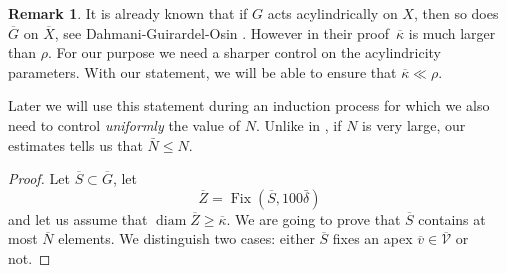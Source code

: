 \documentclass[11pt]{article}
\let\mathcal\mathscr
\theoremstyle{plain}
\theoremstyle{definition}
\newtheorem{rem}[thm]{Remark}
\DeclareMathOperator{\diam}{diam}
\DeclareMathOperator{\Fix}{Fix}
\newcommand{\q}[1]{\overline{#1}}
\begin{document}
\begin{rem}
It is already known that if $G$ acts acylindrically on $X$, then so does~$\q G$ on $\q X$, see Dahmani-Guirardel-Osin \cite[Prop.\,2.17, 5.33]{dahmani_hyperbolically_2017}.
However in their proof~$\q\kappa$ is much larger than $\rho$.
For our purpose we need a sharper control on the acylindricity parameters.
With our statement, we will be able to ensure that $\q\kappa \ll \rho$.

Later we will use this statement during an induction process for which we also need to control \emph{uniformly} the value of $N$.
Unlike in \cite{dahmani_hyperbolically_2017}, if $N$ is very large, our estimates tells us that $\bar N \leq N$.
\end{rem}

\begin{proof}
Let $\q S \subset \q G$, let
\[
\q Z= \Fix(\q S, 100\bar\delta)
\]
and let us assume that $\diam \q Z \geqslant \q \kappa$.
We are going to prove that $\q S$ contains at most $\q N$ elements.
We distinguish two cases: either $\q S$ fixes an apex $\q v \in \q {\mathcal V}$ or not.


\end{proof}
\end{document}
